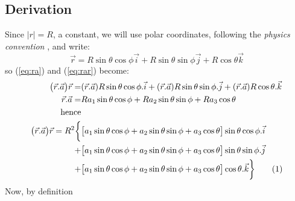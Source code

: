 \documentclass[]{article}
\newcommand\numberthis{\addtocounter{equation}{1}\tag{\theequation}}
\begin{document}
\subsection{Derivation}
Since $|r|=R$, a constant, we will use polar coordinates, following the \emph{physics convention} \cite{schaum-basic} \cite{wiki-polar}, and write:
$$\vec{r}=R\sin\theta\cos\phi\vec{i}+R\sin\theta\sin\phi\vec{j}+R\cos\theta\vec{k}$$
so (\ref{eq:ra}) and (\ref{eq:rar}) become:
\begin{align*}
\big(\vec{r}.\vec{a}\big)\vec{r} =& (\vec{r}.\vec{a}) R \sin\theta\cos\phi .\vec{i} + (\vec{r}.\vec{a})R\sin\theta\sin\phi . \vec{j} + (\vec{r}.\vec{a}) R\cos\theta. \vec{k}\\
\vec{r}.\vec{a} =& Ra_1\sin\theta\cos\phi + Ra_2\sin\theta\sin\phi + Ra_3 \cos\theta\\
\text{hence}&\\
\big(\vec{r}.\vec{a}\big)\vec{r} = R^2 \bigg\{& \big[a_1\sin\theta\cos\phi + a_2\sin\theta\sin\phi + a_3 \cos\theta\big] \sin\theta\cos\phi.\vec{i}\\ +& \big[a_1\sin\theta\cos\phi + a_2\sin\theta\sin\phi + a_3 \cos\theta\big]\sin\theta\sin\phi. \vec{j}\\
 +& \big[a_1\sin\theta\cos\phi + a_2\sin\theta\sin\phi + a_3 \cos\theta\big] \cos\theta. \vec{k}\bigg\}\numberthis \label{eq:rar_expanded}
\end{align*}
Now, by definition
\end{document}
